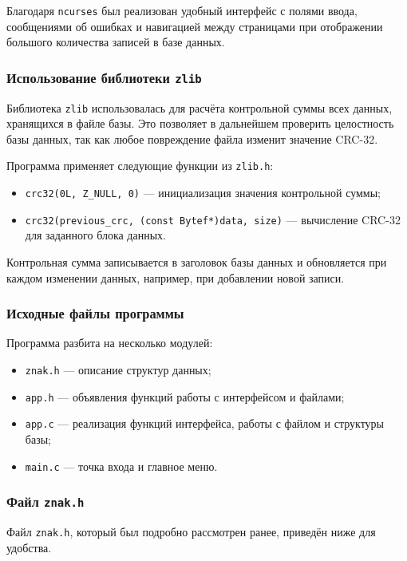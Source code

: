 Благодаря \texttt{ncurses} был реализован удобный интерфейс с полями ввода, сообщениями об ошибках и навигацией между страницами при отображении большого количества записей в базе данных.

\subsubsection*{Использование библиотеки \texttt{zlib}}

Библиотека \texttt{zlib} использовалась для расчёта контрольной суммы всех данных, хранящихся в файле базы. Это позволяет в дальнейшем проверить целостность базы данных, так как любое повреждение файла изменит значение CRC-32.

Программа применяет следующие функции из \texttt{zlib.h}:
\begin{itemize}
    \item \texttt{crc32(0L, Z\_NULL, 0)} — инициализация значения контрольной суммы;
    \item \texttt{crc32(previous\_crc, (const Bytef*)data, size)} — вычисление CRC-32 для заданного блока данных.
\end{itemize}

Контрольная сумма записывается в заголовок базы данных и обновляется при каждом изменении данных, например, при добавлении новой записи.

\subsubsection*{Исходные файлы программы}

Программа разбита на несколько модулей:

\begin{itemize}
    \item \texttt{znak.h} --- описание структур данных;
    \item \texttt{app.h} --- объявления функций работы с интерфейсом и файлами;
    \item \texttt{app.c} --- реализация функций интерфейса, работы с файлом и структуры базы;
    \item \texttt{main.c} --- точка входа и главное меню.
\end{itemize}

\subsubsection*{Файл \texttt{znak.h}}

\noindent
Файл \texttt{znak.h}, который был подробно рассмотрен ранее, приведён ниже для удобства. 

